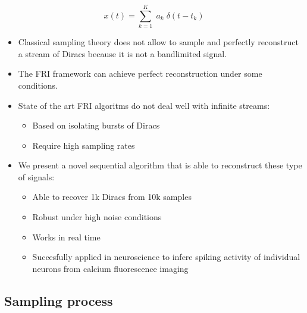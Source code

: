 \documentclass[8pt]{beamer}
\begin{document}
\begin{frame}

\begin{equation*}
x(t) = \sum_{k=1}^{K} \; a_k \; \delta(t-t_k)
\end{equation*}

\begin{itemize}

\item<1-> Classical sampling theory does not allow to sample and perfectly 
reconstruct a stream of Diracs because it is not a bandlimited signal.
\\[.5cm]

\item<2-> The FRI framework can achieve perfect reconstruction under some conditions.
\\[.5cm]

\item<3-> State of the art FRI algoritms do not deal well with infinite streams:
\begin{itemize}
\item Based on isolating bursts of Diracs
\item Require high sampling rates
\\[.5cm]
\end{itemize}

\item<4-> We present a novel sequential algorithm that is able to reconstruct 
these type of signals:
\begin{itemize}
\item Able to recover 1k Diracs from 10k samples
\item Robust under high noise conditions
\item Works in real time
\item Succesfully applied in neuroscience to infere spiking activity of individual 
neurons from calcium fluorescence imaging
\end{itemize}

\end{itemize}

\end{frame}


\subsection{Sampling process} 
\end{document}

